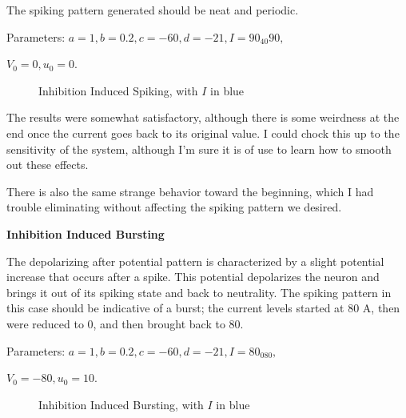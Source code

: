 \documentclass[a4paper,12pt]{article}
\begin{document}
The spiking pattern generated should be neat and periodic.  

\vspace{2mm}

Parameters: $a=1, b=0.2, c=-60, d=-21, I=90_{40}90, $

\vspace{1mm}

$V_{0}=0, u_{0}=0$. 

\begin{figure}[h!]
\begin{center}
\end{center}
\caption{\label{pict19}Inhibition Induced Spiking, with $I$ in blue}
\end{figure}

The results were somewhat satisfactory, although there is some weirdness at the end once the current goes back to its original value. I could chock this up to the sensitivity of the system, although I'm sure it is of use to learn how to smooth out these effects. 

\vspace{2mm}

There is also the same strange behavior toward the beginning, which I had trouble eliminating without affecting the spiking pattern we desired. 

\vfil\eject

{\bf Inhibition Induced Bursting}
\bigskip

The depolarizing after potential pattern is characterized by a slight potential increase that occurs after a spike. This potential depolarizes the neuron and brings it out of its spiking state and back to neutrality. The spiking pattern in this case should be indicative of a burst; the current levels started at 80 A, then were reduced to 0, and then brought back to 80. 

\vspace{2mm} 

Parameters: $a=1, b=0.2, c=-60, d=-21, I=80_080, $

\vspace{1mm}

$V_{0}=-80, u_{0}=10$. 

\begin{figure}[h!]
\begin{center}
\end{center}
\caption{\label{pict20}Inhibition Induced Bursting, with $I$ in blue}
\end{figure}
\end{document}
